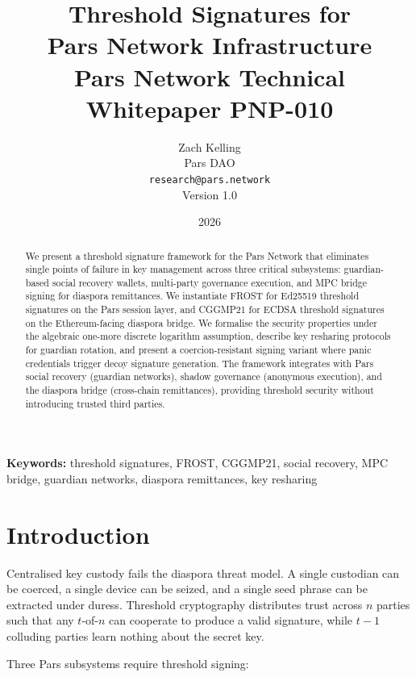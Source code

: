 \documentclass[11pt,a4paper]{article}
\title{%
    \textbf{Threshold Signatures for\\
    Pars Network Infrastructure}\\[0.5em]
    \large Pars Network Technical Whitepaper PNP-010
}
\author{%
    Zach Kelling\\
    Pars DAO\\
    \texttt{research@pars.network}\\[0.5em]
    \small Version 1.0
}
\date{2026}
\begin{document}
\parscoverpage

\thispagestyle{fancy}

\begin{abstract}
\noindent
We present a threshold signature framework for the Pars Network that
eliminates single points of failure in key management across three
critical subsystems: guardian-based social recovery wallets, multi-party
governance execution, and MPC bridge signing for diaspora remittances.
We instantiate FROST for Ed25519 threshold signatures on the Pars session
layer, and CGGMP21 for ECDSA threshold signatures on the Ethereum-facing
diaspora bridge.  We formalise the security properties under the
algebraic one-more discrete logarithm assumption, describe key resharing
protocols for guardian rotation, and present a coercion-resistant
signing variant where panic credentials trigger decoy signature
generation.  The framework integrates with Pars social recovery
(guardian networks), shadow governance (anonymous execution), and the
diaspora bridge (cross-chain remittances), providing threshold security
without introducing trusted third parties.
\end{abstract}

\vspace{1em}
\noindent\textbf{Keywords:} threshold signatures, FROST, CGGMP21,
social recovery, MPC bridge, guardian networks, diaspora remittances,
key resharing

\tableofcontents
\newpage

\section{Introduction}
\label{sec:intro}

Centralised key custody fails the diaspora threat model.  A single
custodian can be coerced, a single device can be seized, and a single
seed phrase can be extracted under duress.  Threshold cryptography
distributes trust across $n$ parties such that any $t$-of-$n$ can
cooperate to produce a valid signature, while $t-1$ colluding parties
learn nothing about the secret key.

Three Pars subsystems require threshold signing:
\end{document}
